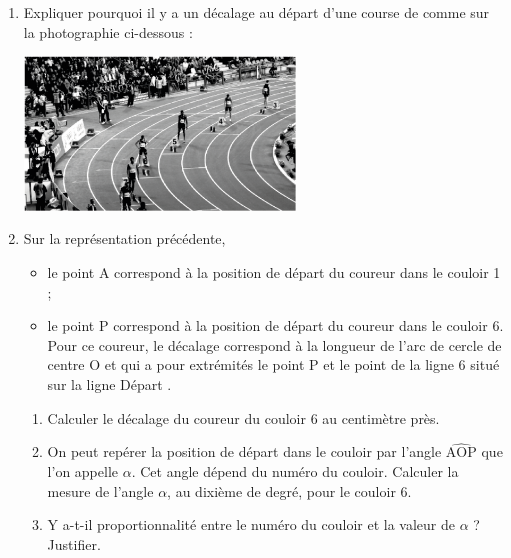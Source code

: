 {\begin{exercice}[CRPE 2018 G3]
\begin{enumerate}
      \item Expliquer pourquoi il y a un décalage au départ d’une course de  comme sur la photographie ci-dessous : \smallskip
         \begin{center}
            \includegraphics[width=7.2cm]{Grandeurs_mesures/Images/M13_ex_stade}
         \end{center} \smallskip
      \item Sur la représentation précédente,
         \begin{itemize}
            \item le point A correspond à la position de départ du coureur dans le couloir 1 ;
            \item le point P correspond à la position de départ du coureur dans le couloir 6. Pour ce coureur, le décalage correspond à la longueur de l'arc de cercle de centre O et qui a pour extrémités le point P et le point de la ligne 6 situé sur la ligne \og Départ \fg.
         \end{itemize}
         \vspace*{-4mm}
         \begin{enumerate}
            \item Calculer le décalage du coureur du couloir 6 au centimètre près.
            \item On peut repérer la position de départ dans le couloir par l’angle $\widehat{\text{AOP}}$ que l’on appelle $\alpha$. Cet angle dépend du numéro du couloir. Calculer la mesure de l’angle $\alpha$, au dixième de degré, pour le couloir 6. 
            \item Y a-t-il proportionnalité entre le numéro du couloir et la valeur de $\alpha$ ? Justifier.
      \end{enumerate}
   \end{enumerate}
\end{exercice}

}

